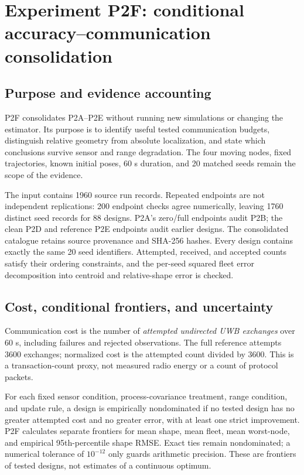 \section{Experiment P2F: conditional accuracy--communication consolidation}
\label{sec:p2f}
\subsection{Purpose and evidence accounting}
P2F consolidates P2A--P2E without running new simulations or changing the estimator. Its purpose is to identify useful tested communication budgets, distinguish relative geometry from absolute localization, and state which conclusions survive sensor and range degradation. The four moving nodes, fixed trajectories, known initial poses, 60 s duration, and 20 matched seeds remain the scope of the evidence.

The input contains 1960 source run records. Repeated endpoints are not independent replications: 200 endpoint checks agree numerically, leaving 1760 distinct seed records for 88 designs. P2A's zero/full endpoints audit P2B; the clean P2D and reference P2E endpoints audit earlier designs. The consolidated catalogue retains source provenance and SHA-256 hashes. Every design contains exactly the same 20 seed identifiers. Attempted, received, and accepted counts satisfy their ordering constraints, and the per-seed squared fleet error decomposition into centroid and relative-shape error is checked.

\subsection{Cost, conditional frontiers, and uncertainty}
Communication cost is the number of \emph{attempted undirected UWB exchanges} over 60 s, including failures and rejected observations. The full reference attempts 3600 exchanges; normalized cost is the attempted count divided by 3600. This is a transaction-count proxy, not measured radio energy or a count of protocol packets.

For each fixed sensor condition, process-covariance treatment, range condition, and update rule, a design is empirically nondominated if no tested design has no greater attempted cost and no greater error, with at least one strict improvement. P2F calculates separate frontiers for mean shape, mean fleet, mean worst-node, and empirical 95th-percentile shape RMSE. Exact ties remain nondominated; a numerical tolerance of \(10^{-12}\) only guards arithmetic precision. These are frontiers of tested designs, not estimates of a continuous optimum.

